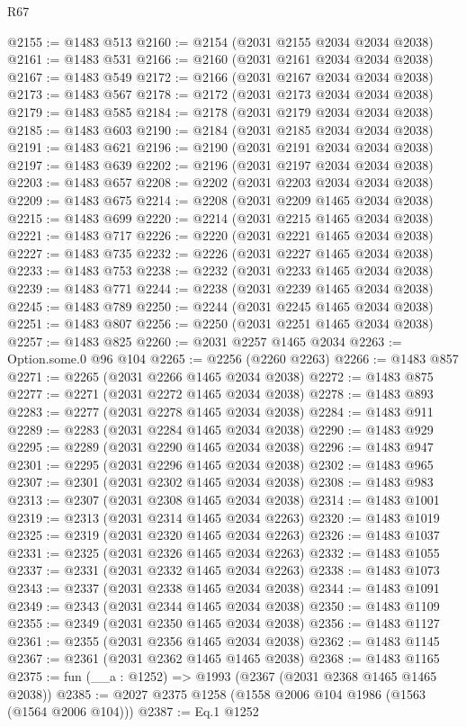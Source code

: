 \begin{lexlean}{R67}
\begin{coremodule}
@2155 := @1483 @513
@2160 := @2154 (@2031 @2155 @2034 @2034 @2038)
@2161 := @1483 @531
@2166 := @2160 (@2031 @2161 @2034 @2034 @2038)
@2167 := @1483 @549
@2172 := @2166 (@2031 @2167 @2034 @2034 @2038)
@2173 := @1483 @567
@2178 := @2172 (@2031 @2173 @2034 @2034 @2038)
@2179 := @1483 @585
@2184 := @2178 (@2031 @2179 @2034 @2034 @2038)
@2185 := @1483 @603
@2190 := @2184 (@2031 @2185 @2034 @2034 @2038)
@2191 := @1483 @621
@2196 := @2190 (@2031 @2191 @2034 @2034 @2038)
@2197 := @1483 @639
@2202 := @2196 (@2031 @2197 @2034 @2034 @2038)
@2203 := @1483 @657
@2208 := @2202 (@2031 @2203 @2034 @2034 @2038)
@2209 := @1483 @675
@2214 := @2208 (@2031 @2209 @1465 @2034 @2038)
@2215 := @1483 @699
@2220 := @2214 (@2031 @2215 @1465 @2034 @2038)
@2221 := @1483 @717
@2226 := @2220 (@2031 @2221 @1465 @2034 @2038)
@2227 := @1483 @735
@2232 := @2226 (@2031 @2227 @1465 @2034 @2038)
@2233 := @1483 @753
@2238 := @2232 (@2031 @2233 @1465 @2034 @2038)
@2239 := @1483 @771
@2244 := @2238 (@2031 @2239 @1465 @2034 @2038)
@2245 := @1483 @789
@2250 := @2244 (@2031 @2245 @1465 @2034 @2038)
@2251 := @1483 @807
@2256 := @2250 (@2031 @2251 @1465 @2034 @2038)
@2257 := @1483 @825
@2260 := @2031 @2257 @1465 @2034
@2263 := Option.some.{0} @96 @104
@2265 := @2256 (@2260 @2263)
@2266 := @1483 @857
@2271 := @2265 (@2031 @2266 @1465 @2034 @2038)
@2272 := @1483 @875
@2277 := @2271 (@2031 @2272 @1465 @2034 @2038)
@2278 := @1483 @893
@2283 := @2277 (@2031 @2278 @1465 @2034 @2038)
@2284 := @1483 @911
@2289 := @2283 (@2031 @2284 @1465 @2034 @2038)
@2290 := @1483 @929
@2295 := @2289 (@2031 @2290 @1465 @2034 @2038)
@2296 := @1483 @947
@2301 := @2295 (@2031 @2296 @1465 @2034 @2038)
@2302 := @1483 @965
@2307 := @2301 (@2031 @2302 @1465 @2034 @2038)
@2308 := @1483 @983
@2313 := @2307 (@2031 @2308 @1465 @2034 @2038)
@2314 := @1483 @1001
@2319 := @2313 (@2031 @2314 @1465 @2034 @2263)
@2320 := @1483 @1019
@2325 := @2319 (@2031 @2320 @1465 @2034 @2263)
@2326 := @1483 @1037
@2331 := @2325 (@2031 @2326 @1465 @2034 @2263)
@2332 := @1483 @1055
@2337 := @2331 (@2031 @2332 @1465 @2034 @2263)
@2338 := @1483 @1073
@2343 := @2337 (@2031 @2338 @1465 @2034 @2038)
@2344 := @1483 @1091
@2349 := @2343 (@2031 @2344 @1465 @2034 @2038)
@2350 := @1483 @1109
@2355 := @2349 (@2031 @2350 @1465 @2034 @2038)
@2356 := @1483 @1127
@2361 := @2355 (@2031 @2356 @1465 @2034 @2038)
@2362 := @1483 @1145
@2367 := @2361 (@2031 @2362 @1465 @1465 @2038)
@2368 := @1483 @1165
@2375 := fun (__a : @1252) => @1993 (@2367 (@2031 @2368 @1465 @1465 @2038))
@2385 := @2027 @2375 @1258 (@1558 @2006 @104 @1986 (@1563 (@1564 @2006 @104)))
@2387 := Eq.{1} @1252

\end{coremodule}
\end{lexlean}
